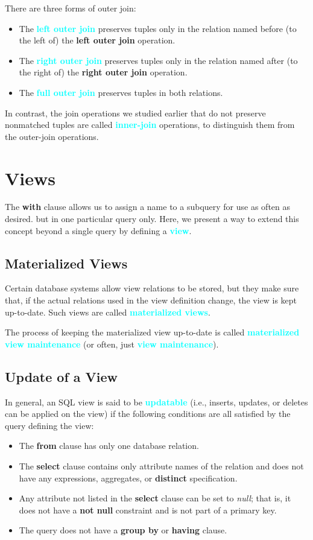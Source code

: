 \documentclass[a4paper,12pt,twoside,openany]{book}
\newcommand{\textcy}[1]{\textbf{\textcolor{cyan}{#1}}}
\begin{document}
There are three forms of outer join:
\begin{itemize}
    \item The \textcy{left outer join} preserves tuples only in the relation named before (to the left of) the \textbf{left outer join} operation.
    \item The \textcy{right outer join} preserves tuples only in the relation named after (to the right of) the \textbf{right outer join} operation.
    \item The \textcy{full outer join} preserves tuples in both relations.
\end{itemize}
In contrast, the join operations we studied earlier that do not preserve nonmatched tuples are called \textcy{inner-join} operations, to distinguish them from the outer-join operations.

\section{Views}

The \textbf{with} clause allows us to assign a name to a subquery for use as often as desired. but in one particular query only. Here, we present a way to extend this concept beyond a single query by defining a \textcy{view}.

\subsection{Materialized Views}

Certain database systems allow view relations to be stored, but they make sure that, if the actual relations used in the view definition change, the view is kept up-to-date. Such views are called \textcy{materialized views}.

The process of keeping the materialized view up-to-date is called \textcy{materialized view maintenance} (or often, just \textcy{view maintenance}).

\subsection{Update of a View}

In general, an SQL view is said to be \textcy{updatable} (i.e., inserts, updates, or deletes can be applied on the view) if the following conditions are all satisfied by the query defining the view:
\begin{itemize}
    \item The \textbf{from} clause has only one database relation.
    \item The \textbf{select} clause contains only attribute names of the relation and does not have any expressions, aggregates, or \textbf{distinct} specification.
    \item Any attribute not listed in the \textbf{select} clause can be set to \textit{null}; that is, it does not have a \textbf{not null} constraint and is not part of a primary key.
    \item The query does not have a \textbf{group by} or \textbf{having} clause.
\end{itemize}
\end{document}
